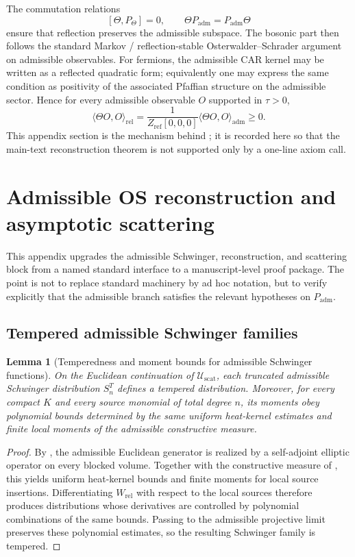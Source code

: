 \documentclass[11pt,a4paper]{article}
\newtheorem{lemma}[theorem]{Lemma}
\theoremstyle{definition}
\theoremstyle{remark}
\newcommand{\Padm}{P_{\mathrm{adm}}}
\begin{document}
The commutation relations
\[
[\Theta,P_\Theta]=0,
\qquad
\Theta\Padm=\Padm\Theta
\]
ensure that reflection preserves the admissible subspace. The bosonic part then follows the standard Markov / reflection-stable Osterwalder--Schrader argument on admissible observables. For fermions, the admissible CAR kernel may be written as a reflected quadratic form; equivalently one may express the same condition as positivity of the associated Pfaffian structure on the admissible sector. Hence for every admissible observable $O$ supported in $\tau>0$,
\[
\langle \Theta O,O\rangle_{\mathrm{rel}}
=
\frac{1}{Z_{\mathrm{ref}}[0,0,0]}
\langle \Theta O,O\rangle_{\mathrm{adm}}
\ge 0.
\]
This appendix section is the mechanism behind ; it is recorded here so that the main-text reconstruction theorem is not supported only by a one-line axiom call.

\section{Admissible OS reconstruction and asymptotic scattering}
\label{app:os-scattering}

This appendix upgrades the admissible Schwinger, reconstruction, and scattering block from a named
standard interface to a manuscript-level proof package. The point is not to replace standard
machinery by ad hoc notation, but to verify explicitly that the admissible branch satisfies the
relevant hypotheses on $\Padm$.

\subsection{Tempered admissible Schwinger families}

\begin{lemma}[Temperedness and moment bounds for admissible Schwinger functions]
\label{lem:tempered-schwinger-bounds}
On the Euclidean continuation of $\mathcal U_{\mathrm{scat}}$, each truncated admissible Schwinger
distribution $S_n^T$ defines a tempered distribution. Moreover, for every compact $K$ and every
source monomial of total degree $n$, its moments obey polynomial bounds determined by the same
uniform heat-kernel estimates and finite local moments of the admissible constructive measure.
\end{lemma}

\begin{proof}
By , the admissible Euclidean generator is realized by a
self-adjoint elliptic operator on every blocked volume. Together with the constructive measure of
, this yields uniform heat-kernel bounds and finite moments
for local source insertions. Differentiating $W_{\mathrm{rel}}$ with respect to the local sources
therefore produces distributions whose derivatives are controlled by polynomial combinations of the
same bounds. Passing to the admissible projective limit preserves these polynomial estimates, so the
resulting Schwinger family is tempered.
\end{proof}
\end{document}

